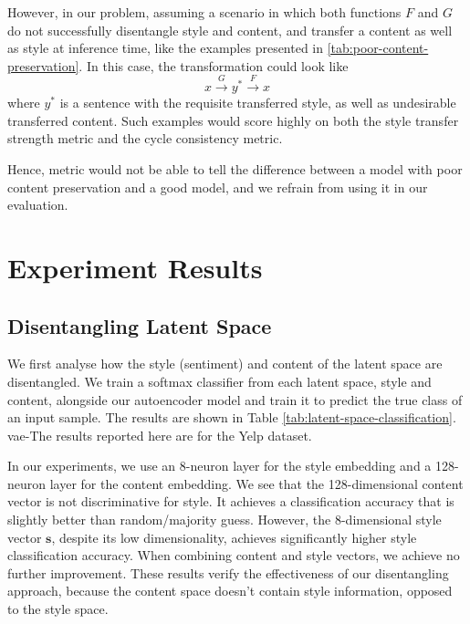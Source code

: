 However, in our problem, assuming a scenario in which both functions $F$ and $G$ do not successfully disentangle style and content, and transfer a content as well as style at inference time, like the examples presented in \ref{tab:poor-content-preservation}. In this case, the transformation could look like
\begin{equation*}
	x \xrightarrow{G} y^* \xrightarrow{F} x
\end{equation*}
where $y^*$ is a sentence with the requisite transferred style, as well as undesirable transferred content. Such examples would score highly on both the style transfer strength metric and the cycle consistency metric.

Hence, metric would not be able to tell the difference between a model with poor content preservation and a good model, and we refrain from using it in our evaluation.


\section{Experiment Results}

\subsection{Disentangling Latent Space}

We first analyse how the style (sentiment) and content of the latent space are disentangled. We train a softmax classifier from each latent space, style and content, alongside our autoencoder model and train it to predict the true class of an input sample. The results are shown in Table \ref{tab:latent-space-classification}. vae-The results reported here are for the Yelp dataset.

In our experiments, we use an 8-neuron layer for the style embedding and a 128-neuron layer for the content embedding. We see that the 128-dimensional content vector is not discriminative for style. It achieves a classification accuracy that is slightly better than random/majority guess. However, the 8-dimensional style vector $\bm s$, despite its low dimensionality, achieves significantly higher style classification accuracy. When combining content and style vectors, we achieve no further improvement. These results verify the effectiveness of our disentangling approach, because the content space doesn't contain style information, opposed to the style space.

